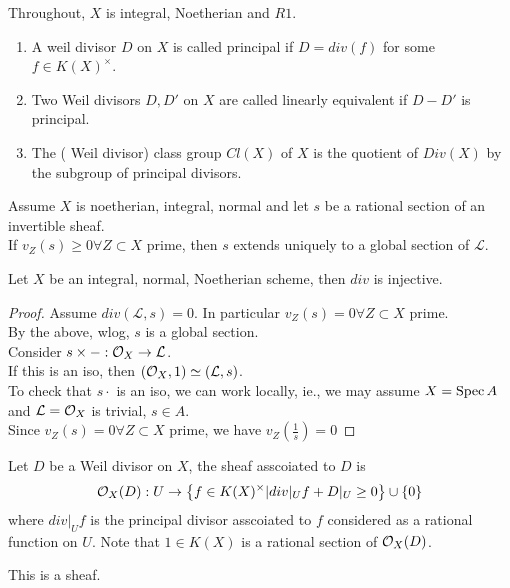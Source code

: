 \documentclass[../main.tex]{subfiles}
\begin{document}
Throughout, $X$ is integral, Noetherian and $R1$.\\
\begin{defn}
\begin{enumerate}
\item A weil divisor $D$ on $X$ is called principal if $D= div ( f) $ for some $f\in K( X)^{\times}$.
\item Two Weil divisors $D,D'$ on $X$ are called linearly equivalent if $D- D'$ is principal.
\item The ( Weil divisor) class group $Cl( X)  $ of $X$ is the quotient of $Div( X) $ by the subgroup of principal divisors.
\end{enumerate}
\end{defn}
\begin{lemma}
Assume $X$ is noetherian, integral, normal and let $s$ be a rational section of an invertible sheaf.\\
If $v_Z( s) \geq 0\forall Z \subset X$ prime, then $s$ extends uniquely to a global section of $ \mathcal{L}$.
\end{lemma}
\begin{propo}
Let $X$ be an integral, normal, Noetherian scheme, then $div$ is injective.
\end{propo}
\begin{proof}
Assume $div(  \mathcal{L},s) =0$. In particular $v_Z( s) =0\forall Z \subset X$ prime.\\
By the above, wlog, $s$ is a global section.\\
Consider $s\times - : \mathcal{O}_X \to \mathcal{L}$.\\
If this is an iso, then $( \mathcal{O}_X,1) \simeq ( \mathcal{L},s) $.\\
To check that $s\cdot$ is an iso, we can work locally, ie., we may assume $X= \operatorname{Spec} A$ and $ \mathcal{L}= \mathcal{O}_X$ is trivial, $s\in A$.\\
Since $v_Z( s) =0 \forall Z \subset X$ prime, we have $v_Z( \frac{1}{s}) =0$ 
\end{proof}
\begin{defn}
	Let $D$ be a Weil divisor on $X$, the sheaf asscoiated to $D$ is 
	\[ 
	\mathcal{O}_X( D): U \to \left\{ f\in K( X)^{\times}|div|_U f + D|_U \geq 0 \right\} \cup \left\{ 0 \right\} 
	\]
	where $div|_U f$ is the principal divisor asscoiated to $f$ considered as a rational function on $U$.
Note that $1\in K( X) $ is a rational section of $\mathcal{O}_X( D) $.	
\end{defn}
This is a sheaf.
\end{document}
